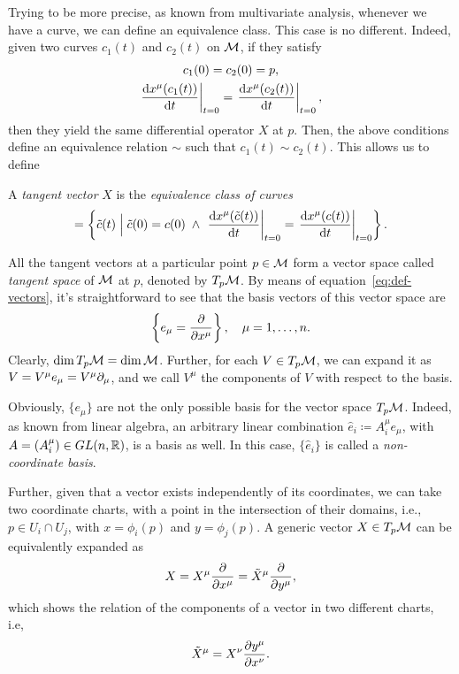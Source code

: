 Trying to be more precise, as known from multivariate analysis, whenever we have a curve, we can define an equivalence class. This case is no different. Indeed, given two curves $c_1(t)$ and $c_2(t)$ on $\mathcal{M}$, if they satisfy
\begin{subequations}
\begin{gather}
    c_1(0)= c_2(0)=p, \\
    \left. \frac{\mathop{}\!\mathrm{d} x^\mu(c_1(t))}{\mathop{}\!\mathrm{d} t} \right|_{t=0} = \left. \frac{\mathop{}\!\mathrm{d} x^\mu(c_2(t))}{\mathop{}\!\mathrm{d} t} \right|_{t=0} ,
\end{gather}
\end{subequations}
then they yield the same differential operator $X$ at $p$. Then, the above conditions define an equivalence relation $\sim$ such that $c_1(t) \sim c_2(t)$. This allows us to define
\begin{definition}[Vector]
    A \emph{tangent vector} $X$ is the \emph{equivalence class of curves}
    \begin{equation}
        [c(t)] = \left\{ \tilde{c}(t) \; \Big| \; \tilde{c}(0) = c(0) \; \land \; \left. \frac{\ud x^\mu (\tilde{c}(t))}{\ud t}\right|_{t=0} = \left. \frac{\ud x^\mu (c(t))}{\ud t}\right|_{t=0} \right\} .
    \end{equation}
\end{definition}
All the tangent vectors at a particular point $p \in \mathcal{M}$ form a vector space called \emph{tangent space} of $\mathcal{M}$ at $p$, denoted by $T_p \mathcal{M}$. By means of equation~\eqref{eq:def-vectors}, it's straightforward to see that the basis vectors of this vector space are
\begin{equation}
    \left\{ e_\mu = \frac{\partial}{\partial x^\mu} \right\}   , \quad \mu = 1, \dots, n.
\end{equation}
Clearly, $\dim T_p \mathcal{M} = \dim \mathcal{M}$. Further, for each $V \in T_p \mathcal{M}$, we can expand it as $V = V^\mu e_\mu = V^\mu \partial_\mu$, and we call $V^\mu$ the components of $V$ with respect to the basis. 

Obviously, $\{e_\mu\}$ are not the only possible basis for the vector space $T_p \mathcal{M}$. Indeed, as known from linear algebra, an arbitrary linear combination $\hat{e}_i \coloneq A_i^\mu e_\mu$, with $A = (A_i^\mu) \in GL(n,\mathbb{R})$, is a basis as well. In this case, $\{\hat{e}_i\}$ is called a \emph{non-coordinate basis}.

Further, given that a vector exists independently of its coordinates, we can take two coordinate charts, with a point in the intersection of their domains, i.e., $p \in U_i \cap U_j$, with $x = \phi_i(p)$ and $y = \phi_j (p)$. A generic vector $X \in T_p \mathcal{M}$ can be equivalently expanded as
\begin{equation}
    X = X^\mu \frac{\partial}{\partial x^\mu} = \tilde{X}^\mu \frac{\partial}{\partial y^\mu},
\end{equation}
which shows the relation of the components of a vector in two different charts, i.e,
\begin{equation}
    \tilde{X}^\mu = X^\nu \frac{\partial y^\mu}{\partial x^\nu}.
\end{equation}

